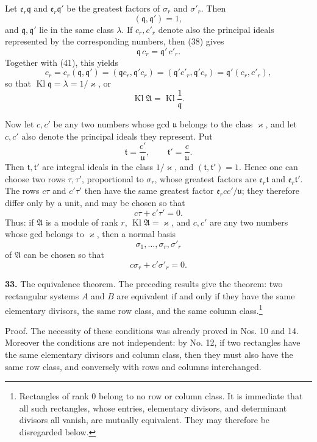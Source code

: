 \documentclass[11pt,a4paper]{article}
\newcommand{\Kl}{\operatorname{Kl}}
\begin{document}
Let \(\mathfrak e_r\mathfrak q\) and \(\mathfrak e_r\mathfrak q'\) be the greatest factors of \(\sigma_r\) and \(\sigma'_r\). Then
\[
 (\mathfrak q,\mathfrak q')=1, \tag{41}
\]
and \(\mathfrak q,\mathfrak q'\) lie in the same class \(\lambda\). If \(c_r,c'_r\) denote also the principal ideals represented by the corresponding numbers, then (38) gives
\[
 \mathfrak q\,c_r=\mathfrak q'\,c'_r.
\]
Together with (41), this yields
\[
 c_r=c_r(\mathfrak q,\mathfrak q')=(\mathfrak q c_r,\mathfrak q'c_r)
       =(\mathfrak q'c'_r,\mathfrak q'c_r)=\mathfrak q'(c_r,c'_r),
\]
so that \(\Kl\mathfrak q=\lambda=1/\varkappa\), or
\[
 \Kl\mathfrak A=\Kl\frac{1}{\mathfrak q}. \tag{42}
\]

Now let \(c,c'\) be any two numbers whose gcd \(\mathfrak u\) belongs to the class \(\varkappa\), and let \(c,c'\) also denote the principal ideals they represent. Put
\[
 \mathfrak t=\frac{c'}{\mathfrak u},\qquad
 \mathfrak t'=\frac{c}{\mathfrak u}.
\]
Then \(\mathfrak t,\mathfrak t'\) are integral ideals in the class \(1/\varkappa\), and \((\mathfrak t,\mathfrak t')=1\). Hence one can choose two rows \(\tau,\tau'\), proportional to \(\sigma_r\), whose greatest factors are \(\mathfrak e_r\mathfrak t\) and \(\mathfrak e_r\mathfrak t'\). The rows \(c\tau\) and \(c'\tau'\) then have the same greatest factor \(\mathfrak e_r cc'/\mathfrak u\); they therefore differ only by a unit, and may be chosen so that
\[
 c\tau+c'\tau'=0.
\]
Thus: if \(\mathfrak A\) is a module of rank \(r\), \(\Kl\mathfrak A=\varkappa\), and \(c,c'\) are any two numbers whose gcd belongs to \(\varkappa\), then a normal basis
\[
 \sigma_1,\ldots,\sigma_r,\sigma'_r
\]
of \(\mathfrak A\) can be chosen so that
\[
 c\sigma_r+c'\sigma'_r=0.
\]

\textbf{33.} The equivalence theorem. The preceding results give the theorem: two rectangular systems \(A\) and \(B\) are equivalent if and only if they have the same elementary divisors, the same row class, and the same column class.\footnote{Rectangles of rank \(0\) belong to no row or column class. It is immediate that all such rectangles, whose entries, elementary divisors, and determinant divisors all vanish, are mutually equivalent. They may therefore be disregarded below.}

Proof. The necessity of these conditions was already proved in Nos. 10 and 14. Moreover the conditions are not independent: by No. 12, if two rectangles have the same elementary divisors and column class, then they must also have the same row class, and conversely with rows and columns interchanged.
\end{document}
